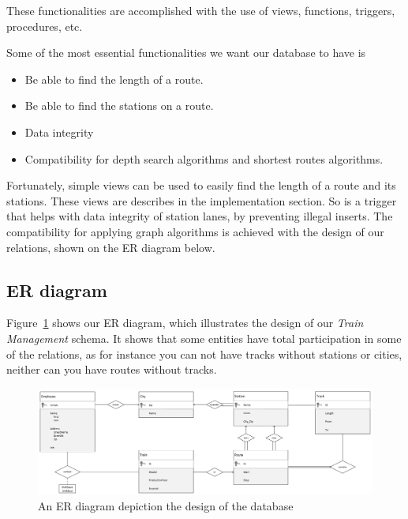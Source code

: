 These functionalities are accomplished with the use of views, functions, 
triggers, procedures, etc.

Some of the most essential functionalities we want our database to have is
\begin{itemize}
\item Be able to find the length of a route.
\item Be able to find the stations on a route.
\item Data integrity
\item Compatibility for depth search algorithms and shortest routes algorithms.
\end{itemize}

Fortunately, simple views can be used to easily find the length of a route and its stations. These views are describes in the implementation section. So is a trigger that helps with data integrity of station lanes, by preventing illegal inserts. The compatibility for applying graph algorithms is achieved with the design of our relations, shown on the ER diagram below.

\subsection{ER diagram}
Figure~\ref{fig:ER} shows our ER diagram, which illustrates the design of our 
\emph{Train Management} schema. It shows that some entities have total 
participation in some of the relations, as for instance you can not have tracks 
without stations or cities, neither can you have routes without tracks.

\begin{figure}[ht!]
    \centering
    \includegraphics[angle=90,origin=c,width=.45\textwidth]{img/Handwritten_ER}
    \caption{An ER diagram depiction the design of the database}
    \label{fig:ER}
\end{figure}


